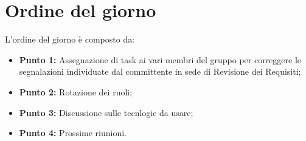 \section{Ordine del giorno}
L'ordine del giorno è composto da: 
\begin{itemize}
	\item \textbf{Punto 1:} Assegnazione di task ai vari membri del gruppo per correggere le segnalazioni individuate dal committente in sede di Revisione dei Requisiti;
	\item \textbf{Punto 2:} Rotazione dei ruoli;
	\item \textbf{Punto 3:} Discussione sulle tecnlogie da usare;
	\item \textbf{Punto 4:} Prossime riunioni.
\end{itemize}
